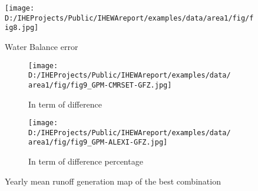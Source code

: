 \documentclass[oneside,openany]{article}%
\begin{document}
\begin{figure}[H]%
\centering%
\texttt{[image: D:/IHEProjects/Public/IHEWAreport/examples/data/area1/fig/fig8.jpg]}%
\caption{Water Balance error}%
\label{figure:fig16}%
\end{figure}

%


\begin{figure}[H]%
\begin{subfigure}[c]{0.5\textwidth}%
\texttt{[image: D:/IHEProjects/Public/IHEWAreport/examples/data/area1/fig/fig9\_GPM-CMRSET-GFZ.jpg]}%
\caption{In term of difference}%
\end{subfigure}%
\begin{subfigure}[c]{0.5\textwidth}%
\texttt{[image: D:/IHEProjects/Public/IHEWAreport/examples/data/area1/fig/fig9\_GPM-ALEXI-GFZ.jpg]}%
\caption{In term of difference percentage}%
\end{subfigure}%
\caption{Yearly mean runoff generation map of the best combination}%
\label{figure:fig17}%
\end{figure}

%
\end{document}

